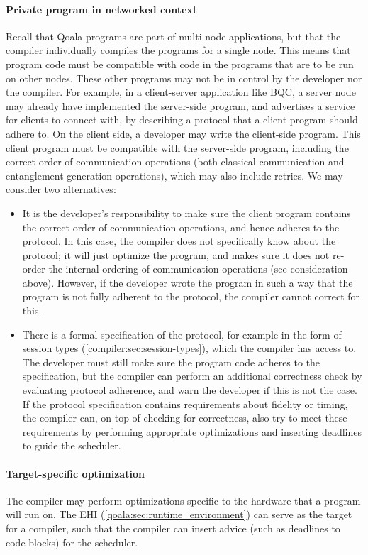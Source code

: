 \paragraph{Private program in networked context}
Recall that Qoala programs are part of multi-node applications, but that the compiler individually compiles the programs for a single node.
This means that program code must be compatible with code in the programs that are to be run on other nodes.
These other programs may not be in control by the developer nor the compiler.
For example, in a client-server application like BQC, a server node may already have implemented the server-side program, and advertises a service for clients to connect with, by describing a protocol that a client program should adhere to.
On the client side, a developer may write the client-side program.
This client program must be compatible with the server-side program, including the correct order of communication operations (both classical communication and entanglement generation operations), which may also include retries.
We may consider two alternatives:
\begin{itemize}
  \item It is the developer's responsibility to make sure the client program contains the correct order of communication operations, and hence adheres to the protocol.
  In this case, the compiler does not specifically know about the protocol; it will just optimize the program, and makes sure it does not re-order the internal ordering of communication operations (see consideration above).
  However, if the developer wrote the program in such a way that the program is not fully adherent to the protocol, the compiler cannot correct for this.
  \item There is a formal specification of the protocol, for example in the form of session types (\cref{compiler:sec:session-types}), which the compiler has access to.
  The developer must still make sure the program code adheres to the specification, but the compiler can perform an additional correctness check by evaluating protocol adherence, and warn the developer if this is not the case.
  If the protocol specification contains requirements about fidelity or timing, the compiler can, on top of checking for correctness, also try to meet these requirements by performing appropriate optimizations and inserting deadlines to guide the scheduler.
\end{itemize}



\paragraph{Target-specific optimization}
The compiler may perform optimizations specific to the hardware that a program will run on.
The \acf{EHI} (\cref{qoala:sec:runtime_environment}) can serve as the target for a compiler, such that the compiler can insert advice (such as deadlines to code blocks) for the scheduler.



